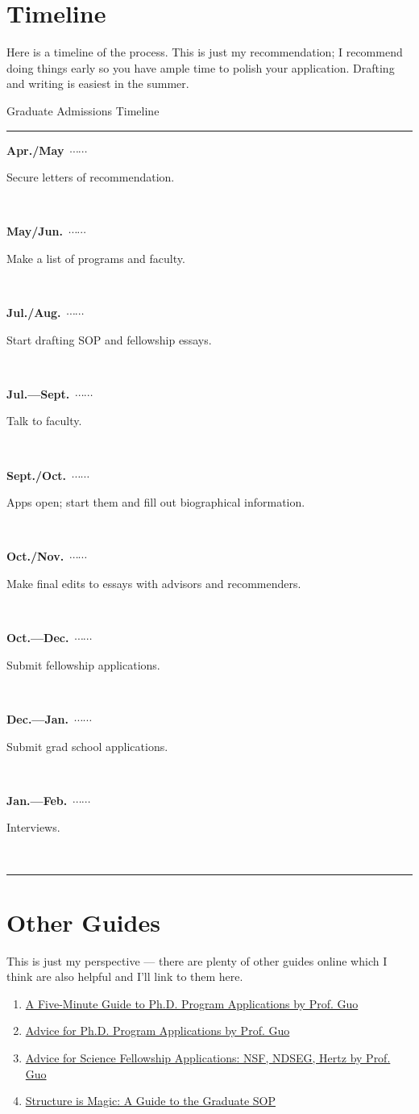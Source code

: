 \documentclass[12pt]{article}
\newcommand\ytl[2]{
\parbox[b]{8em}{\hfill{\color{Maroon}\bfseries\rmfamily #1}~$\cdots\cdots$~}\makebox[0pt][c]{$\bullet$}\vrule\quad \parbox[c]{4.5cm}{\vspace{7pt}\color{MidnightBlue}\raggedright\rmfamily #2.\\[7pt]}\\[-3pt]}
\begin{document}
\section{Timeline}
Here is a timeline of the process. This is just my recommendation; I recommend doing things early so you have ample time to polish your application. Drafting and writing is easiest in the summer.

\begin{table}[!h]
\caption{Graduate Admissions Timeline}
\centering
\begin{minipage}[t]{.7\linewidth}
\color{gray}
\rule{\linewidth}{1pt}
\ytl{Apr./May}{Secure letters of recommendation}
\ytl{May/Jun.}{Make a list of programs and faculty}
\ytl{Jul./Aug.}{Start drafting SOP and fellowship essays}
\ytl{Jul.---Sept.}{Talk to faculty}
\ytl{Sept./Oct.}{Apps open; start them and fill out biographical information}
\ytl{Oct./Nov.}{Make final edits to essays with advisors and recommenders}
\ytl{Oct.---Dec.}{Submit fellowship applications}
\ytl{Dec.---Jan.}{Submit grad school applications}
\ytl{Jan.---Feb.}{Interviews}
\bigskip
\rule{\linewidth}{1pt}%
\end{minipage}%
\end{table}

\section{Other Guides}
This is just my perspective --- there are plenty of other guides online which I think are also helpful and I'll link to them here.
\begin{enumerate}
\item \href{http://www.pgbovine.net/PhD-application-tips.htm}{A Five-Minute Guide to Ph.D. Program Applications by Prof. Guo}

\item \href{http://www.pgbovine.net/grad-school-app-tips.htm}{Advice for Ph.D. Program Applications by Prof. Guo
}

\item \href{http://www.pgbovine.net/fellowship-tips.htm}{Advice for Science Fellowship Applications: NSF, NDSEG, Hertz
 by Prof. Guo}

 \item \href{http://writeivy.com/structure-is-magic-a-guide-to-the-graduate-sop/}{Structure is Magic: A Guide to the Graduate SOP}
\end{enumerate}
\end{document}
